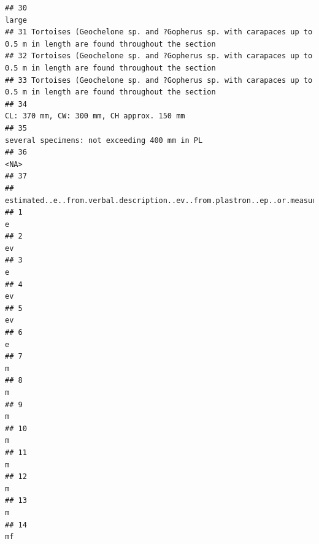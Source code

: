 \documentclass[]{article}
\begin{document}
\begin{verbatim}
## 30                                                                                                             large
## 31 Tortoises (Geochelone sp. and ?Gopherus sp. with carapaces up to 0.5 m in length are found throughout the section
## 32 Tortoises (Geochelone sp. and ?Gopherus sp. with carapaces up to 0.5 m in length are found throughout the section
## 33 Tortoises (Geochelone sp. and ?Gopherus sp. with carapaces up to 0.5 m in length are found throughout the section
## 34                                                                         CL: 370 mm, CW: 300 mm, CH approx. 150 mm
## 35                                                                     several specimens: not exceeding 400 mm in PL
## 36                                                                                                              <NA>
## 37                                                                                                                  
##    estimated..e..from.verbal.description..ev..from.plastron..ep..or.measured..m..measured.from.figure..mf..
## 1                                                                                                         e
## 2                                                                                                        ev
## 3                                                                                                         e
## 4                                                                                                        ev
## 5                                                                                                        ev
## 6                                                                                                         e
## 7                                                                                                         m
## 8                                                                                                         m
## 9                                                                                                         m
## 10                                                                                                        m
## 11                                                                                                        m
## 12                                                                                                        m
## 13                                                                                                        m
## 14                                                                                                       mf

\end{verbatim}
\end{document}
